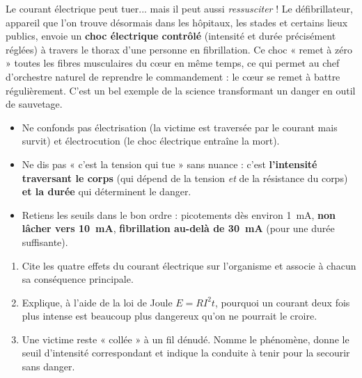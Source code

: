 \documentclass[11pt]{article}
\newcommand{\cle}[1]{{\popxbold\color{popdark}#1}}
\begin{document}
\begin{savaistu}
Le courant électrique peut tuer... mais il peut aussi \emph{ressusciter} ! Le \cle{défibrillateur}, appareil que l'on trouve désormais dans les hôpitaux, les stades et certains lieux publics, envoie un \textbf{choc électrique contrôlé} (intensité et durée précisément réglées) à travers le thorax d'une personne en fibrillation. Ce choc « remet à zéro » toutes les fibres musculaires du cœur en même temps, ce qui permet au chef d'orchestre naturel de reprendre le commandement : le cœur se remet à battre régulièrement. C'est un bel exemple de la science transformant un danger en outil de sauvetage.
\end{savaistu}

\begin{attention}
\begin{itemize}
\item Ne confonds pas \cle{électrisation} (la victime est traversée par le courant mais survit) et \cle{électrocution} (le choc électrique entraîne la mort).
\item Ne dis pas « c'est la tension qui tue » sans nuance : c'est \textbf{l'intensité traversant le corps} (qui dépend de la tension \emph{et} de la résistance du corps) \textbf{et la durée} qui déterminent le danger.
\item Retiens les seuils dans le bon ordre : picotements dès environ \SI{1}{mA}, \textbf{non lâcher vers \SI{10}{mA}}, \textbf{fibrillation au-delà de \SI{30}{mA}} (pour une durée suffisante).
\end{itemize}
\end{attention}

\begin{exercice}
\begin{enumerate}
\item Cite les quatre effets du courant électrique sur l'organisme et associe à chacun sa conséquence principale.
\item Explique, à l'aide de la loi de Joule $E = R I^{2} t$, pourquoi un courant deux fois plus intense est beaucoup plus dangereux qu'on ne pourrait le croire.
\item Une victime reste « collée » à un fil dénudé. Nomme le phénomène, donne le seuil d'intensité correspondant et indique la conduite à tenir pour la secourir sans danger.
\end{enumerate}
\end{exercice}
\end{document}
